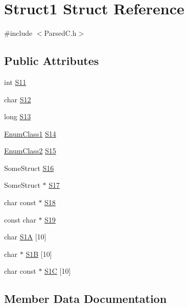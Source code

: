 \hypertarget{structStruct1}{}\section{Struct1 Struct Reference}
\label{structStruct1}


{\ttfamily \#include $<$Parsed\+C.\+h$>$}

\subsection*{Public Attributes}
\begin{DoxyCompactItemize}
\item 
int \hyperlink{structStruct1_ab81c8013900545021cda963327e1ed73}{S11}
\item 
char \hyperlink{structStruct1_ab5b5ef0442d62f260d3231bfe93f4d3d}{S12}
\item 
long \hyperlink{structStruct1_a2cfde9a801e79d5c1589c5861b52400f}{S13}
\item 
\hyperlink{ParsedC_8h_a542930d5f2f117ff1e21206f2baa51c5}{Enum\+Class1} \hyperlink{structStruct1_afddb16c0b88164bd8aa20988ed456111}{S14}
\item 
\hyperlink{ParsedC_8h_a51df612b239afb50004d7a39b20a5745}{Enum\+Class2} \hyperlink{structStruct1_ae2f5a2f538ffd72951049d7f1a823c37}{S15}
\item 
Some\+Struct \hyperlink{structStruct1_a3b6b2444b54b42fe87aedcada8bfecfb}{S16}
\item 
Some\+Struct $\ast$ \hyperlink{structStruct1_a0b1fc8567906ca443688e94d01589064}{S17}
\item 
char const  $\ast$ \hyperlink{structStruct1_aca681fbabd712288a75280ae511e3fc1}{S18}
\item 
const char $\ast$ \hyperlink{structStruct1_a31b80270ff0d1a01aad2c27a4a55377e}{S19}
\item 
char \hyperlink{structStruct1_a67451c56b7de613f0cbc5834854e04e4}{S1A} \mbox{[}10\mbox{]}
\item 
char $\ast$ \hyperlink{structStruct1_a7275b7b9103247c4731f8f849bbd3cc2}{S1B} \mbox{[}10\mbox{]}
\item 
char const  $\ast$ \hyperlink{structStruct1_a861259f7512616e2a7603ab735c7f5c0}{S1C} \mbox{[}10\mbox{]}
\end{DoxyCompactItemize}


\subsection{Member Data Documentation}
\mbox{\label{structStruct1_ab81c8013900545021cda963327e1ed73}} 
